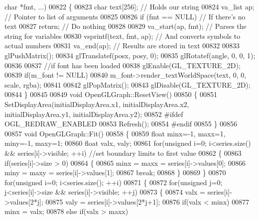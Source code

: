 \begin{DoxyCode}
{{{{{{{{{       \textcolor{keywordtype}{char} *fmt, ...)
00822 \{
00823     \textcolor{keywordtype}{char} text[256];                 \textcolor{comment}{// Holds our string}
00824     va\_list ap;             \textcolor{comment}{// Pointer to list of arguments}
00825 
00826     \textcolor{keywordflow}{if} (fmt == NULL)        \textcolor{comment}{// If there's no text}
00827         \textcolor{keywordflow}{return};         \textcolor{comment}{// Do nothing}
00828 
00829     va\_start(ap, fmt);      \textcolor{comment}{// Parses the string for variables}
00830         vsprintf(text, fmt, ap);    \textcolor{comment}{// And converts symbols to actual numbers}
00831     va\_end(ap);         \textcolor{comment}{// Results are stored in text}
00832 
00833     glPushMatrix();
00834     glTranslatef(posx, posy, 0);
00835     glRotatef(angle, 0, 0, 1);
00836 
00837     \textcolor{comment}{//if font has been loaded}
00838     glEnable(GL_TEXTURE_2D);
00839     \textcolor{keywordflow}{if}(m_font != NULL)
00840             m_font->render_textWorldSpace(text, 0, 0, scale, rgba);
00841 
00842     glPopMatrix();
00843     glDisable(GL_TEXTURE_2D);
00844 \}
00845 
00849 \textcolor{keywordtype}{void} OpenGLGraph::ResetView()
00850 \{
00851     SetDisplayArea(initialDisplayArea.x1, initialDisplayArea.x2, 
      initialDisplayArea.y1, initialDisplayArea.y2);
00852 \textcolor{preprocessor}{#ifdef OGL\_REDRAW\_ENABLED}
00853     Refresh();
00854 \textcolor{preprocessor}{#endif}
00855 \}
00856 
00857 \textcolor{keywordtype}{void} OpenGLGraph::Fit()
00858 \{
00859     \textcolor{keywordtype}{float} minx=-1, maxx=1, miny=-1, maxy=1;
00860     \textcolor{keywordtype}{float} valx, valy;
00861     \textcolor{keywordflow}{for}(\textcolor{keywordtype}{unsigned} i=0; i<series.size() && series[i]->visible; ++i) \textcolor{comment}{//set boundary limits to first value}
00862     \{
00863         \textcolor{keywordflow}{if}(series[i]->size > 0)
00864         \{
00865             minx = maxx = series[i]->values[0];
00866             miny = maxy = series[i]->values[1];
00867             \textcolor{keywordflow}{break};
00868         \}
00869     \}
00870     \textcolor{keywordflow}{for}(\textcolor{keywordtype}{unsigned} i=0; i<series.size(); ++i)
00871     \{
00872         \textcolor{keywordflow}{for}(\textcolor{keywordtype}{unsigned} j=0; j<series[i]->size && series[i]->visible; ++j)
00873         \{
00874             valx = series[i]->values[2*j];
00875             valy = series[i]->values[2*j+1];
00876             \textcolor{keywordflow}{if}(valx < minx)
00877                 minx = valx;
00878             \textcolor{keywordflow}{else} \textcolor{keywordflow}{if}(valx > maxx)
}}}}}}}}}
\end{DoxyCode}
